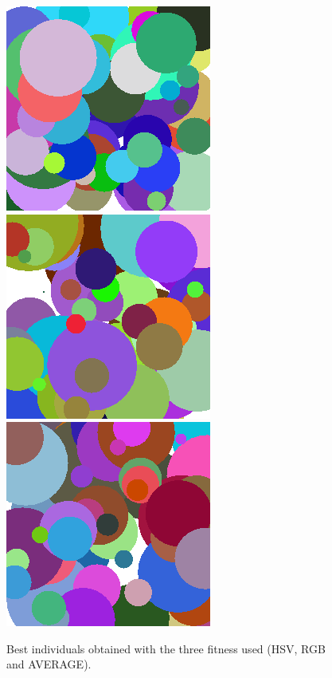 \begin{figure}
\centering
   \includegraphics[scale =0.5] {gfx/art/RGB.png}
   \includegraphics[scale =0.5] {gfx/art/HSV.png}
   \includegraphics[scale =0.5] {gfx/art/AVERAGE.png}
\caption{Best individuals obtained with the three fitness used (HSV, RGB and AVERAGE).}
\label{fig:bestinds}
\end{figure}

